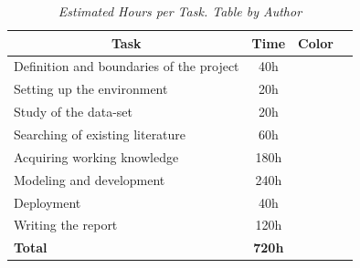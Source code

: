 \begin{table}[H] \centering
  \begin{tabular}{| l | c | c | c |}
    \hline
    \multicolumn{1}{|c|}{\textbf{Task}} & \multicolumn{1}{c|}{\textbf{Time}} & \multicolumn{1}{c|}{\textbf{Color}} \\
    \hline
    Definition and boundaries of the project & 40h & \cellcolor{red!50} \\
    \hline
    Setting up the environment & 20h & \cellcolor{lime!50} \\
    \hline
    Study of the data-set & 20h & \cellcolor{blue!40} \\
    \hline
    Searching of existing literature & 60h & \cellcolor{teal!50} \\
    \hline
    Acquiring working knowledge & 180h & \cellcolor{amber!30} \\
    \hline
    Modeling and development & 240h & \cellcolor{black!70} \\
    \hline
    Deployment & 40h & \cellcolor{gray!50} \\
    \hline
    Writing the report & 120h & \cellcolor{orange!50} \\
    \hline
    \textbf{Total} & \textbf{720h} & \\
    \hline
  \end{tabular}
  \caption[Estimated Hours per Task.]{\textit{Estimated Hours per Task. Table by Author}}
  {\label{table:timeline_tasks}}
\end{table}

